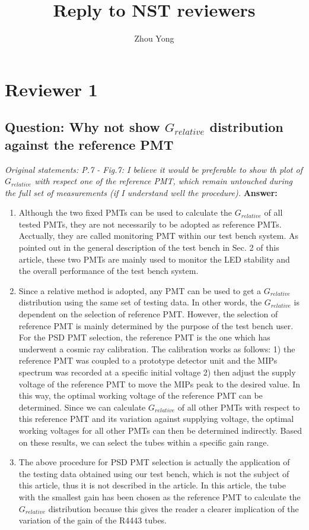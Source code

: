 \documentclass[]{article}
\title{Reply to NST reviewers}
\author{Zhou Yong}
\begin{document}
\maketitle

\section{Reviewer 1}
\subsection{Question: Why not show $G_{relative}$ distribution against the reference PMT}
\textit{Original statements: P.7 - Fig.7: I believe it would be preferable to show th plot of $G_{relative}$ with respect one of the reference PMT, which remain untouched during the full set of measurements (if I understand well the procedure).} \newline
\textbf{Answer:}
\begin{enumerate}
	\item Although the two fixed PMTs can be used to calculate the $G_{relative}$ of all tested PMTs, they are not necessarily to be adopted as reference PMTs.  Acctually, they are called monitoring PMT  within our test bench system. As pointed out in the general description of the test bench in Sec. 2 of this article, these two PMTs are mainly used to monitor the LED stability and the overall performance of the test bench system. 
	\item Since a relative method is adopted, any PMT can be used to get a $G_{relative}$ distribution using the same set of testing data. In other words, the $G_{relative}$ is dependent on the selection of reference PMT. However, the selection of reference PMT is mainly determined by the purpose of the test bench user. For the PSD PMT selection, the reference  PMT is the one which has underwent a cosmic ray calibration. The calibration works as follows: 1) the reference PMT was coupled to a prototype detector unit and the MIPs spectrum was recorded at a specific initial voltage 2) then adjust the supply voltage of the reference PMT  to move the MIPs peak to the desired value. In this way, the optimal working voltage of the reference PMT can be determined. Since we can calculate $G_{relative}$ of all other PMTs with respect to this reference PMT and its variation against supplying voltage, the optimal working voltages for all other PMTs can then be determined indirectly. Based on these results, we can select the tubes within a specific gain range.
	\item The above procedure for  PSD PMT selection is actually the application of the testing data obtained using our test bench, which is not the subject of this article, thus it is not described in the article. In this article, the tube with the smallest gain has been chosen as the reference PMT to calculate the $G_{relative}$ distribution because this gives the reader a clearer implication of the variation of the gain of the R4443 tubes.
\end{enumerate}
\end{document}
